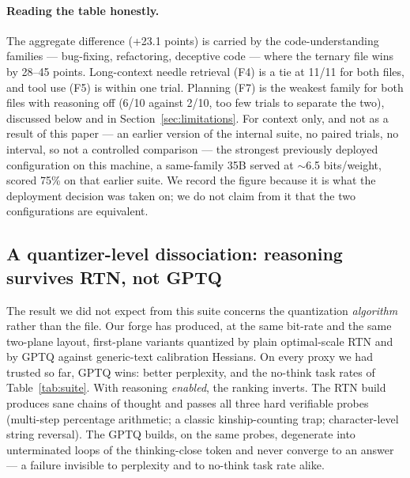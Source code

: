 \documentclass[10pt]{article} %
\begin{document}
\paragraph{Reading the table honestly.} The aggregate difference (+23.1
points) is carried by the code-understanding families --- bug-fixing,
refactoring, deceptive code --- where the ternary file wins by 28--45 points.
Long-context needle retrieval (F4) is a tie at 11/11 for both files, and tool
use (F5) is within one trial. Planning (F7) is the weakest family for both
files with reasoning off (6/10 against 2/10, too few trials to separate the
two), discussed below and in Section~\ref{sec:limitations}. For
context only, and not as a result of this paper --- an earlier version of the
internal suite, no paired trials, no interval, so not a
controlled comparison --- the strongest previously deployed configuration on
this machine, a same-family 35B served at $\sim$6.5 bits/weight, scored 75\%
on that earlier suite. We record the figure because it is what the deployment
decision was taken on; we do not claim from it that the two configurations are
equivalent.

\subsection{A quantizer-level dissociation: reasoning survives RTN, not GPTQ}
\label{sec:dissociation}

The result we did not expect from this suite concerns the quantization
\emph{algorithm} rather than the file. Our forge has produced, at the same
bit-rate and the same two-plane layout, first-plane variants quantized by
plain optimal-scale RTN and by GPTQ against generic-text calibration
Hessians. On every proxy we had trusted so far, GPTQ wins: better
perplexity, and the no-think task rates of Table~\ref{tab:suite}. With
reasoning \emph{enabled}, the ranking inverts. The RTN build produces sane
chains of thought and passes all three hard verifiable probes (multi-step
percentage arithmetic; a classic kinship-counting trap; character-level
string reversal). The GPTQ builds, on the same probes, degenerate into
unterminated loops of the thinking-close token and never converge to an
answer --- a failure invisible to perplexity and to no-think task rate alike.
\end{document}
